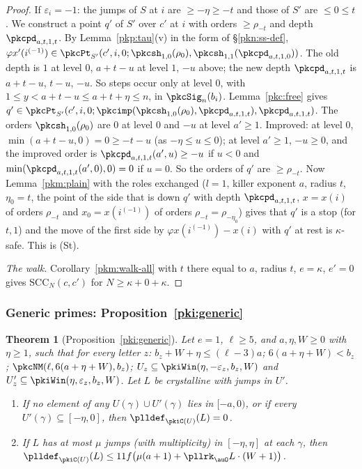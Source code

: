 \documentclass[10pt]{amsart}
\newtheorem{theorem}{Theorem}[section]
\theoremstyle{definition}
\theoremstyle{remark}
\begin{document}
\begin{proof}
If $\varepsilon_i=-1$: the jumps of $S$ at $i$ are $\ge-\eta\ge-t$ and those of $S'$ are $\le0\le t$.
We construct a point $q'$ of $S'$ over $c'$ at $i$ with orders $\ge\rho_{-t}$ and depth
$\pkcpd_{a,t,1,t}$. By Lemma~\ref{pkp:tau}(v) in the form of \S\ref{pkn:ss-def},
$\varphi x'(i^{(-1)})\in\pkcPt_{S'}(c',i,0;\pkcsh_{1,0}(\rho_0),\pkcsh_{1,1}(\pkcpd_{a,t,1,0}))$. The old
depth is $1$ at level $0$, $a+t-u$ at level $1$, $-u$ above; the new depth $\pkcpd_{a,t,1,t}$ is
$a+t-u$, $t-u$, $-u$. So steps occur only at level $0$, with $1\le y<a+t-u\le a+t+\eta\le n$, in
$\pkcSig_n(b_i)$. Lemma~\ref{pkc:free} gives $q'\in\pkcPt_{S'}(c',i,0;\pkcimp(\pkcsh_{1,0}(\rho_0),
\pkcpd_{a,t,1,t}),\pkcpd_{a,t,1,t})$. The orders $\pkcsh_{1,0}(\rho_0)$ are $0$ at level $0$ and $-u$ at
level $a'\ge1$. Improved: at level $0$, $\min(a+t-u,0)=0\ge-t-u$ (as $-\eta\le u\le0$); at level
$a'\ge1$, $-u\ge0$, and the improved order is $\pkcpd_{a,t,1,t}(a',u)\ge-u$ if $u<0$ and
$\min(\pkcpd_{a,t,1,t}(a',0),0)=0$ if $u=0$. So the orders of $q'$ are $\ge\rho_{-t}$. Now
Lemma~\ref{pkm:plain} with the roles exchanged ($l=1$, killer exponent $a$, radius $t$, $\eta_0=t$,
the point of the side that is down $q'$ with depth $\pkcpd_{a,t,1,t}$, $x=x(i)$ of orders
$\rho_{-t}$ and $x_0=x(i^{(-1)})$ of orders $\rho_{-t}=\rho_{-\eta_0}$) gives that $q'$ is a stop
(for $t,1$) and the move of the first side by $\varphi x(i^{(-1)})-x(i)$ with $q'$ at rest is
$\kappa$-safe. This is (St).

\emph{The walk.} Corollary~\ref{pkm:walk-all} with $t$ there equal to $a$, radius $t$, $e=\kappa$,
$e'=0$ gives $\mathrm{SCC}_N(c,c')$ for $N\ge\kappa+0+\kappa$.
\end{proof}

\subsubsection{Generic primes: Proposition~\ref{pki:generic}}\label{pkc:ss-generic}

\begin{theorem}[Proposition~\ref{pki:generic}]\label{pkc:generic}
Let $e=1$, $\ell\ge5$, and $a,\eta,W\ge0$ with $\eta\ge1$, such that for every letter $z$:
$b_z+W+\eta\le(\ell-3)a$; $6(a+\eta+W)<b_z$; $\pkcNM(\ell,6(a+\eta+W),b_z)$; $U_z\subseteq
\pkiWin(\eta,-\varepsilon_z,b_z,W)$ and $U'_z\subseteq\pkiWin(\eta,\varepsilon_z,b_z,W)$. Let $L$ be
crystalline with jumps in $U'$.
\begin{enumerate}
\item[(i)] If no element of any $U(\gamma)\cup U'(\gamma)$ lies in $[-a,0)$, or if every
$U'(\gamma)\subseteq[-\eta,0]$, then $\plldef_{\pkiC(U)}(L)=0$.
\item[(ii)] If $L$ has at most $\mu$ jumps (with multiplicity) in $[-\eta,\eta]$ at each $\gamma$, then
$\plldef_{\pkiC(U)}(L)\le11f\bigl(\mu(a+1)+\pllrk_\auO L\cdot(W+1)\bigr)$.
\end{enumerate}
\end{theorem}
\end{document}
